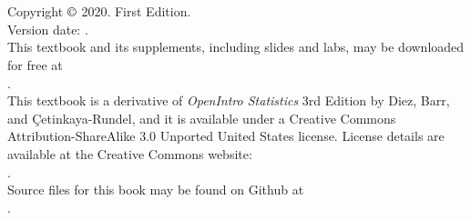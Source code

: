 \chapter*{}
\vfill


\noindent%
Copyright $\copyright$ 2020. First Edition. \\
Version date: \versiondate. \\

\noindent%
This textbook and its supplements, including slides and labs, may be downloaded for free at \\
. \\

\noindent%
This textbook is a derivative of \emph{OpenIntro Statistics} 3rd Edition by Diez, Barr, and \c{C}etinkaya-Rundel, and it is available under a Creative Commons Attribution-ShareAlike 3.0 Unported United States license. License details are available at the Creative Commons website: \\
. \\

\noindent%
Source files for this book may be found on Github at \\
.
